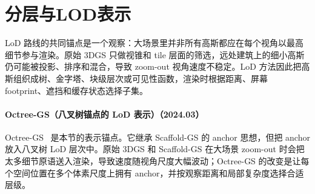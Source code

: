 \section{分层与LOD表示}

LoD 路线的共同锚点是一个观察：大场景里并非所有高斯都应在每个视角以最高细节参与渲染。原始 3DGS 只做视锥和 tile 层面的筛选，远处建筑上的细小高斯仍可能被投影、排序和混合，导致 zoom-out 视角速度不稳定。LoD 方法因此把高斯组织成树、金字塔、块级层次或可见性函数，渲染时根据距离、屏幕 footprint、遮挡和缓存状态选择子集。
\paragraph{Octree-GS（八叉树锚点的 LoD 表示）（2024.03）}
Octree-GS~\cite{2403_17898} 是本节的表示锚点。它继承 Scaffold-GS 的 anchor 思想，但把 anchor 放入八叉树 LoD 层次中。原始 3DGS 和 Scaffold-GS 在大场景 zoom-out 时会把太多细节原语送入渲染，导致速度随视角尺度大幅波动；Octree-GS 的改变是让每个空间位置在多个体素尺度上拥有 anchor，并按观察距离和局部复杂度选择合适层级。

